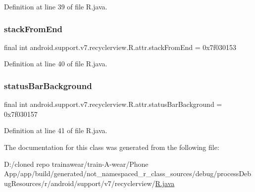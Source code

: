 Definition at line 39 of file R.\+java.

\mbox{\label{classandroid_1_1support_1_1v7_1_1recyclerview_1_1_r_1_1attr_ad048157c30076371166ead7bb83de5f3}} 
\subsubsection{\texorpdfstring{stackFromEnd}{stackFromEnd}}
{\footnotesize\ttfamily final int android.\+support.\+v7.\+recyclerview.\+R.\+attr.\+stack\+From\+End = 0x7f030153\hspace{0.3cm}{\ttfamily [static]}}



Definition at line 40 of file R.\+java.

\mbox{\label{classandroid_1_1support_1_1v7_1_1recyclerview_1_1_r_1_1attr_aa5139957d7634ac7127856d8307007af}} 
\subsubsection{\texorpdfstring{statusBarBackground}{statusBarBackground}}
{\footnotesize\ttfamily final int android.\+support.\+v7.\+recyclerview.\+R.\+attr.\+status\+Bar\+Background = 0x7f030157\hspace{0.3cm}{\ttfamily [static]}}



Definition at line 41 of file R.\+java.



The documentation for this class was generated from the following file\+:\begin{DoxyCompactItemize}
\item 
D\+:/cloned repo trainawear/train-\/\+A-\/wear/\+Phone App/app/build/generated/not\+\_\+namespaced\+\_\+r\+\_\+class\+\_\+sources/debug/process\+Debug\+Resources/r/android/support/v7/recyclerview/\mbox{\hyperlink{process_debug_resources_2r_2android_2support_2v7_2recyclerview_2_r_8java}{R.\+java}}\end{DoxyCompactItemize}
